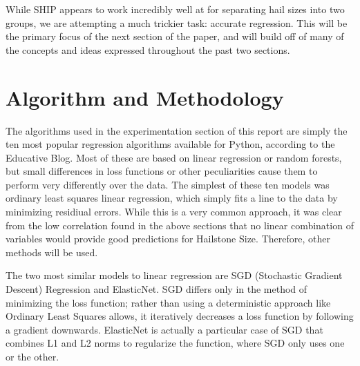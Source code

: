 \documentclass[fleqn,10pt]{SelfArx} %
\begin{document}
While SHIP appears to work incredibly well at for separating hail sizes into two groups, we are attempting a much trickier task: accurate regression. This will be the primary focus of the next section of the paper, and will build off of many of the concepts and ideas expressed throughout the past two sections.


\bigskip
\bigskip


\section{Algorithm and Methodology}

The algorithms used in the experimentation section of this report are simply the ten most popular regression algorithms available for Python, according to the Educative Blog. Most of these are based on linear regression or random forests, but small differences in loss functions or other peculiarities cause them to perform very differently over the data. The simplest of these ten models was ordinary least squares linear regression, which simply fits a line to the data by minimizing residiual errors. While this is a very common approach, it was clear from the low correlation found in the above sections that no linear combination of variables would provide good predictions for Hailstone Size. Therefore, other methods will be used. 

The two most similar models to linear regression are SGD (Stochastic Gradient Descent) Regression and ElasticNet. SGD differs only in the method of minimizing the loss function; rather than using a deterministic approach like Ordinary Least Squares allows, it iteratively decreases a loss function by following a gradient downwards. ElasticNet is actually a particular case of SGD that combines L1 and L2 norms to regularize the function, where SGD only uses one or the other.
\end{document}
